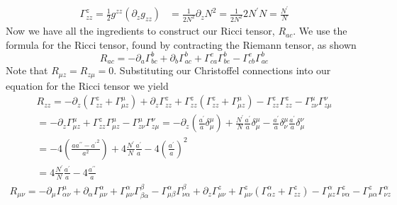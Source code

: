 \documentclass[11pt]{report}
\numberwithin{equation}{chapter}
\begin{document}
\begin{equation}
    \begin{aligned}
        \Gamma_{zz}^z = \frac{1}{2}g^{zz}(\partial_{z}g_{zz}) &= \frac{1}{2N^2}\partial_{z}N^2 = \frac{1}{2N^2}2N^\prime N = \frac{N^\prime}{N}
    \end{aligned}
\end{equation}
Now we have all the ingredients to construct our Ricci tensor, $R_{ac}$. We use the formula for the Ricci tensor, found by contracting the Riemann tensor, as shown
\begin{equation}
    R_{ac} = -\partial_{a}\Gamma_{bc}^b + \partial_{b}\Gamma_{ac}^b + \Gamma_{ca}^e\Gamma_{be}^b - \Gamma_{cb}^e\Gamma_{ae}^b
\end{equation}
Note that $R_{\mu z} = R_{z\mu}=0$. Substituting our Christoffel connections into our equation for the Ricci tensor we yield
\begin{equation}
    \begin{aligned}
        R_{zz} = -\partial_{z}(\Gamma_{zz}^{z} + \Gamma_{\mu z}^{\mu}) + \partial_{z}\Gamma_{zz}^{z} + \Gamma_{zz}^{z}(\Gamma_{zz}^{z} + \Gamma_{\mu z}^{\mu}) - \Gamma_{zz}^{z}\Gamma_{zz}^{z} -\Gamma_{z \nu}^{\mu}\Gamma_{z\mu}^{\nu} \\
        = -\partial_{z}\Gamma_{\mu z}^{\mu} + \Gamma_{zz}^{z}\Gamma_{\mu z}^{\mu} - \Gamma_{z \nu}^{\mu}\Gamma_{z\mu}^{\nu} = -\partial_{z}(\frac{a^\prime}{a}\delta_{\mu}^{\mu}) + \frac{N^\prime}{N}\frac{a^\prime}{a}\delta_{\mu}^{\mu} - \frac{a^\prime}{a}\delta_{\nu}^{\mu}\frac{a^\prime}{a}\delta_{\mu}^{\nu}
        \\ = -4(\frac{a a^{\prime\prime} - {a^{\prime}}^2}{a^2}) + 4\frac{N^\prime}{N}\frac{a^\prime}{a} - 4(\frac{a^\prime}{a})^2 \\ = 4\frac{N^\prime}{N}\frac{a^\prime}{a} - 4\frac{a^{\prime\prime}}{a}
    \end{aligned}
\end{equation}
\begin{equation}
    \begin{aligned}
        R_{\mu \nu} = -\partial_{\mu}\Gamma_{\alpha\nu}^{\mu} + \partial_{\alpha}\Gamma_{\mu\nu}^{\alpha} + \Gamma_{\mu\nu}^{\alpha}\Gamma_{\beta\alpha}^{\beta} - \Gamma_{\mu\beta}^{\alpha}\Gamma_{\nu\alpha}^{\beta} + \partial_{z}\Gamma_{\mu \nu}^{z} + \Gamma_{\mu \nu}^{z}(\Gamma_{\alpha z}^{\alpha} + \Gamma_{zz}^{z}) - \Gamma_{\mu z}^{\alpha}\Gamma_{\nu\alpha}^{z} - \Gamma_{\mu \alpha}^{z}\Gamma_{\nu z}^{\alpha}
    \end{aligned}
\end{equation}
\end{document}
